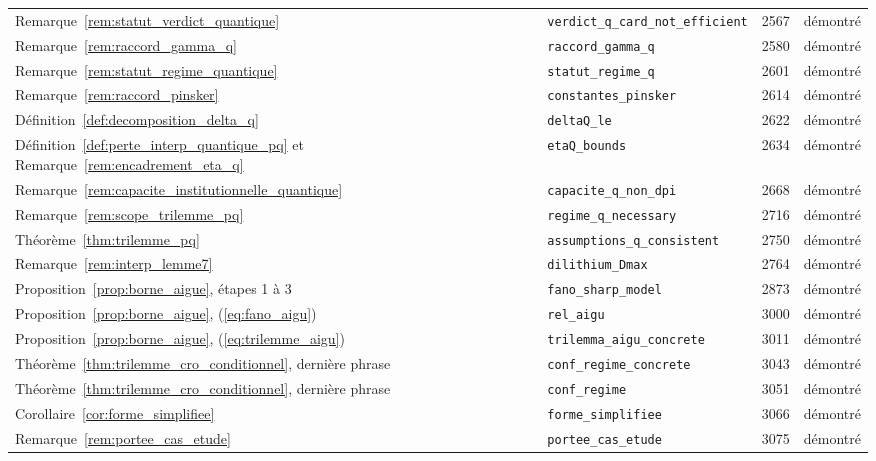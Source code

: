 {\begin{longtable}{@{}p{4.6cm}p{5.2cm}p{0.9cm}>{\raggedright\arraybackslash}p{3.6cm}@{}}
Remarque~\ref{rem:statut_verdict_quantique} & \texttt{verdict\_\allowbreak{}q\_\allowbreak{}card\_\allowbreak{}not\_\allowbreak{}efficient} & 2567 & démontré \\
Remarque~\ref{rem:raccord_gamma_q} & \texttt{raccord\_\allowbreak{}gamma\_\allowbreak{}q} & 2580 & démontré \\
Remarque~\ref{rem:statut_regime_quantique} & \texttt{statut\_\allowbreak{}regime\_\allowbreak{}q} & 2601 & démontré \\
Remarque~\ref{rem:raccord_pinsker} & \texttt{constantes\_\allowbreak{}pinsker} & 2614 & démontré \\
Définition~\ref{def:decomposition_delta_q} & \texttt{deltaQ\_\allowbreak{}le} & 2622 & démontré \\
Définition~\ref{def:perte_interp_quantique_pq} et Remarque~\ref{rem:encadrement_eta_q} & \texttt{etaQ\_\allowbreak{}bounds} & 2634 & démontré \\
Remarque~\ref{rem:capacite_institutionnelle_quantique} & \texttt{capacite\_\allowbreak{}q\_\allowbreak{}non\_\allowbreak{}dpi} & 2668 & démontré \\
Remarque~\ref{rem:scope_trilemme_pq} & \texttt{regime\_\allowbreak{}q\_\allowbreak{}necessary} & 2716 & démontré \\
Théorème~\ref{thm:trilemme_pq} & \texttt{assumptions\_\allowbreak{}q\_\allowbreak{}consistent} & 2750 & démontré \\
Remarque~\ref{rem:interp_lemme7} & \texttt{dilithium\_\allowbreak{}Dmax} & 2764 & démontré \\
Proposition~\ref{prop:borne_aigue}, étapes 1 à 3 & \texttt{fano\_\allowbreak{}sharp\_\allowbreak{}model} & 2873 & démontré \\
Proposition~\ref{prop:borne_aigue}, (\ref{eq:fano_aigu}) & \texttt{rel\_\allowbreak{}aigu} & 3000 & démontré \\
Proposition~\ref{prop:borne_aigue}, (\ref{eq:trilemme_aigu}) & \texttt{trilemma\_\allowbreak{}aigu\_\allowbreak{}concrete} & 3011 & démontré \\
Théorème~\ref{thm:trilemme_cro_conditionnel}, dernière phrase & \texttt{conf\_\allowbreak{}regime\_\allowbreak{}concrete} & 3043 & démontré \\
Théorème~\ref{thm:trilemme_cro_conditionnel}, dernière phrase & \texttt{conf\_\allowbreak{}regime} & 3051 & démontré \\
Corollaire~\ref{cor:forme_simplifiee} & \texttt{forme\_\allowbreak{}simplifiee} & 3066 & démontré \\
Remarque~\ref{rem:portee_cas_etude} & \texttt{portee\_\allowbreak{}cas\_\allowbreak{}etude} & 3075 & démontré \\

\end{longtable}}
